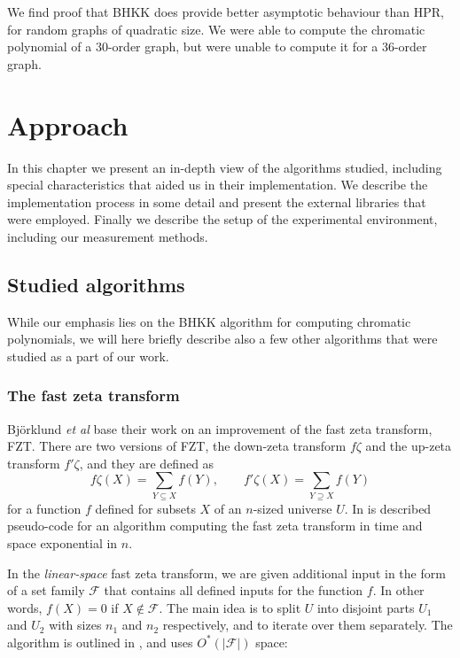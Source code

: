 \documentclass{cslthse-msc}
\begin{document}
We find proof that BHKK does provide better asymptotic behaviour than HPR, for random graphs of quadratic size. We were able to compute the chromatic polynomial of a 30-order graph, but were unable to compute it for a 36-order graph.

\chapter{Approach}
In this chapter we present an in-depth view of the algorithms studied, including special characteristics that aided us in their implementation. We describe the implementation process in some detail and present the external libraries that were employed. Finally we describe the setup of the experimental environment, including our measurement methods.


\section{Studied algorithms}
While our emphasis lies on the BHKK algorithm for computing chromatic polynomials, we will here briefly describe also a few other algorithms that were studied as a part of our work.

\subsection{The fast zeta transform}
Björklund \emph{et al} \cite{cov_pack} base their work on an improvement of the fast zeta transform, FZT. There are two versions of FZT, the down-zeta transform $f\zeta$ and the up-zeta transform $f'\zeta$, and they are defined as
\[
 f\zeta(X) = \sum_{Y \subseteq X} f(Y), \qquad f'\zeta(X) = \sum_{Y \supseteq X} f(Y)
\]
for a function $f$ defined for subsets $X$ of an $n$-sized universe $U$. In \cite[p.5]{cov_pack} is described pseudo-code for an algorithm computing the fast zeta transform in time and space exponential in $n$. 

In the \emph{linear-space} fast zeta transform, we are given additional input in the form of a set family $\mathcal{F}$ that contains all defined inputs for the function $f$. In other words, $f(X) = 0$ if $X \notin \mathcal{F}$. The main idea is to split $U$ into disjoint parts $U_1$ and $U_2$ with sizes $n_1$ and $n_2$ respectively, and to iterate over them separately. The algorithm is outlined in \cite[sec.3]{cov_pack}, and uses $O^*(|\mathcal{F}|)$ space:
\end{document}
